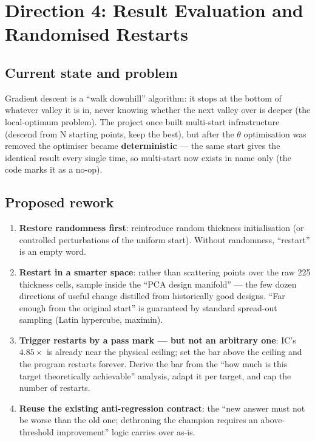 \documentclass[11pt,a4paper]{article}
\begin{document}
\section{Direction 4: Result Evaluation and Randomised Restarts}

\subsection{Current state and problem}

Gradient descent is a ``walk downhill'' algorithm: it stops at the bottom of whatever valley it is in, never knowing whether the next valley over is deeper (the local-optimum problem). The project once built multi-start infrastructure (descend from N starting points, keep the best), but after the $\theta$ optimisation was removed the optimiser became \textbf{deterministic} --- the same start gives the identical result every single time, so multi-start now exists in name only (the code marks it as a no-op).

\subsection{Proposed rework}

\begin{enumerate}[leftmargin=2em]
\item \textbf{Restore randomness first}: reintroduce random thickness initialisation (or controlled perturbations of the uniform start). Without randomness, ``restart'' is an empty word.
\item \textbf{Restart in a smarter space}: rather than scattering points over the raw 225 thickness cells, sample inside the ``PCA design manifold'' --- the few dozen directions of useful change distilled from historically good designs. ``Far enough from the original start'' is guaranteed by standard spread-out sampling (Latin hypercube, maximin).
\item \textbf{Trigger restarts by a pass mark --- but not an arbitrary one}: IC's $4.85\times$ is already near the physical ceiling; set the bar above the ceiling and the program restarts forever. Derive the bar from the ``how much is this target theoretically achievable'' analysis, adapt it per target, and cap the number of restarts.
\item \textbf{Reuse the existing anti-regression contract}: the ``new answer must not be worse than the old one; dethroning the champion requires an above-threshold improvement'' logic carries over as-is.
\end{enumerate}
\end{document}
